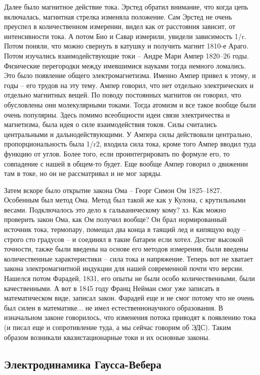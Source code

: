 \documentclass[a4paper, 12pt]{article}
\begin{document}
Далее было магнитное действие тока. Эрстед обратил внимание, что когда 
цепь включалась, магнитная стрелка изменяла положение. Сам Эрстед не 
очень преуспел в количественном измерении, видел как от расстояния 
зависит, от интенсивности тока. А потом Био и Савар измерили, увидели 
зависимость 1/r. Потом поняли, что можно свернуть в катушку и получить 
магнит 1810-е Араго. Потом изучались взаимодействующие токи -- Андре 
Мари Ампер 1820--26 годы. Физические перегородки между имевшимися 
науками тогда немного ломались. Это было появление общего 
электромагнетизма. Именно Ампер привел к этому, и годы -- его трудов на 
эту тему. Ампер говорил, что нет отдельно электрических и отдельно 
магнитных вещей. По поводу постоянных магнитов он говорил, что 
обусловлены они молекулярными токами. Тогда атомизм и все такое вообще 
были очень популярны. Здесь помимо всеобщности идеи связи электричества 
и магнетизма, была идея о силе взаимодействия токов. Силы считались 
центральными и дальнодействующими. У Ампера силы действовали центрально, 
пропорциональность была 1/r2, входила сила тока, кроме того Ампер вводил 
туда функцию от углов. Более того, если проинтегрировать по формуле его, 
то совпадение с нашей в общем-то будет. Еще вообще Ампер говорил 
о движении там в токе, но он не рассматривал и не мог заряды.

Затем вскоре было открытие закона Ома -- Георг Симон Ом 1825--1827. 
Особенным был метод Ома. Метод был такой же как у Кулона, с крутильными 
весами. Подключалось это дело к гальваническому кому? хз. Как можно 
проверить закон Ома, как Ом получил вообще? Он брал нормированный 
источник тока, термопару, помещал два конца в таящий лед и кипящую воду 
-- строго сто градусов -- и соединял в такие батареи если хотел. Достиг 
высокой точности, также были введены на основе его методов измерения, 
были введены количественные характеристики -- сила тока и напряжение. 
Теперь вот не хватает закона электромагнитной индукции для нашей 
современной почти что версии. Нашелся потом Фарадей, 1831, его опыты не 
были особо количественными, были качественными. А вот в 1845 году Франц 
Нейман смог уже записать в математическом виде, записал закон. Фарадей 
еще и не смог потому что не очень был силен в математике... не имел 
естественнонаучного образования. В изначальном законе говорилось, что 
изменения потока приводят к появлению тока (и писал еще и сопротивление 
туда, а мы сейчас говорим об ЭДС). Таким образом возникали 
квазистационарные токи и их основные законы.

\subsection{Электродинамика Гаусса-Вебера}
\end{document}
